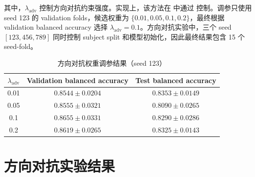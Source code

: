 其中，$\lambda_{\mathrm{adv}}$ 控制方向对抗约束强度。实现上，该方法在  中通过  控制。调参只使用 seed 123 的 validation folds，候选权重为 $\{0.01,0.05,0.1,0.2\}$，最终根据 validation balanced accuracy 选择 $\lambda_{\mathrm{adv}}=0.1$。方向对抗实验中，三个 seed $[123,456,789]$ 同时控制 subject split 和模型初始化，因此最终结果包含 15 个 seed-fold。

\begin{table}[H]
  \centering
  \caption{方向对抗权重调参结果（seed 123）}
  \begin{tabular}{ccc}
    \toprule
    $\lambda_{\mathrm{adv}}$ & Validation balanced accuracy & Test balanced accuracy \\
    \midrule
    0.01 & $0.8544 \pm 0.0204$ & $0.8353 \pm 0.0149$ \\
    0.05 & $0.8555 \pm 0.0321$ & $0.8090 \pm 0.0265$ \\
    0.1 & $\mathbf{0.8655 \pm 0.0331}$ & $0.8290 \pm 0.0286$ \\
    0.2 & $0.8619 \pm 0.0265$ & $0.8325 \pm 0.0143$ \\
    \bottomrule
  \end{tabular}
\end{table}

\section{方向对抗实验结果}

\begin{table}[H]
  \centering
  \caption{方向对抗训练主结果（三个 seed，共 15 个 seed-fold）}
  \small
\end{table}

